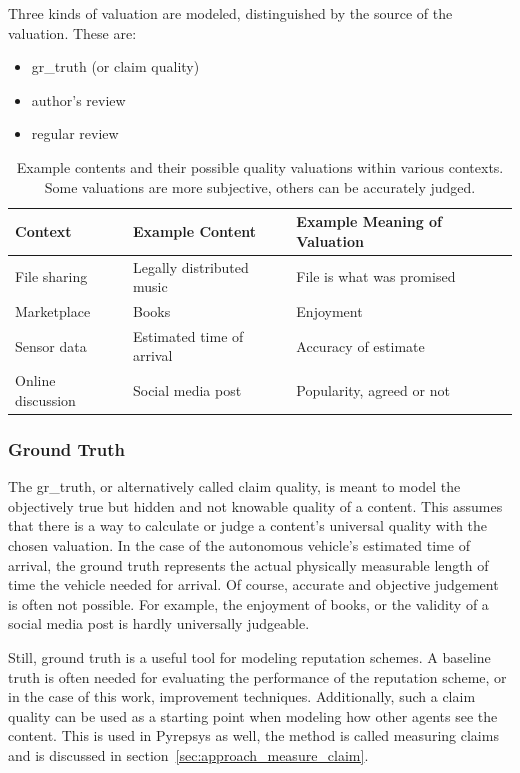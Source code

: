 \documentclass[%
    ]{\PathToTumTemplate/thesis/tum_thesis}
\begin{document}
Three kinds of valuation are modeled, distinguished by the source of the valuation. These are:
\begin{itemize}
	\item \gls{gr_truth} (or claim quality)
	\item author's review
	\item regular review
\end{itemize}


\begin{table}[tbp]
\centering
\begin{tabular}{lll}
\toprule
\textbf{Context}        & \textbf{Example Content} & \textbf{Example Meaning of Valuation} \\ \midrule
File sharing       & Legally distributed music & File is what was promised \\
Marketplace        & Books & Enjoyment \\
Sensor data     & Estimated time of arrival & Accuracy of estimate \\
Online discussion   & Social media post & Popularity, agreed or not \\
\bottomrule
\end{tabular}
\caption{
	Example contents and their possible quality valuations within various contexts.
	Some valuations are more subjective, others can be accurately judged.
}
\label{tab:content_examples}
\end{table}

\subsubsection{Ground Truth}
The \gls{gr_truth}, or alternatively called claim quality, is meant to model the objectively true but hidden and not knowable quality of a content.
This assumes that there is a way to calculate or judge a content's universal quality with the chosen valuation.
In the case of the autonomous vehicle's estimated time of arrival, the ground truth represents the actual physically measurable length of time the vehicle needed for arrival.
Of course, accurate and objective judgement is often not possible.
For example, the enjoyment of books, or the validity of a social media post is hardly universally judgeable.

Still, ground truth is a useful tool for modeling reputation schemes.
A baseline truth is often needed for evaluating the performance of the reputation scheme, or in the case of this work, improvement techniques.
Additionally, such a claim quality can be used as a starting point when modeling how other agents see the content.
This is used in Pyrepsys as well, the method is called measuring claims and is discussed in section~\ref{sec:approach_measure_claim}.
\end{document}
